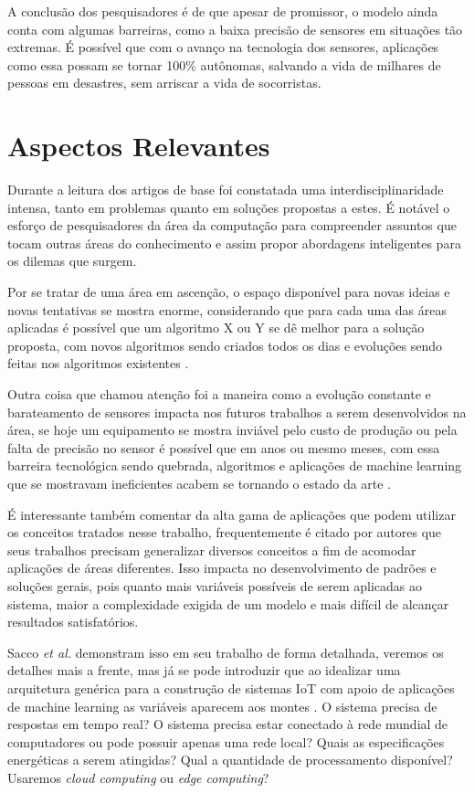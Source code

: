 \documentclass[12pt]{article}
\begin{document}
A conclusão dos pesquisadores é de que apesar de promissor, o modelo ainda conta com algumas barreiras, como a baixa precisão de sensores em situações tão extremas. É possível que com o avanço na tecnologia dos sensores, aplicações como essa possam se tornar 100\% autônomas, salvando a vida de milhares de pessoas em desastres, sem arriscar a vida de socorristas.

\section{Aspectos Relevantes}

Durante a leitura dos artigos de base foi constatada uma interdisciplinaridade intensa, tanto em problemas quanto em soluções propostas a estes. É notável o esforço de pesquisadores da área da computação para compreender assuntos que tocam outras áreas do conhecimento e assim propor abordagens inteligentes para os dilemas que surgem.

Por se tratar de uma área em ascenção, o espaço disponível para novas ideias e novas tentativas se mostra enorme, considerando que para cada uma das áreas aplicadas é possível que um algoritmo X ou Y se dê melhor para a solução proposta, com novos algoritmos sendo criados todos os dias e evoluções sendo feitas nos algoritmos existentes \cite{hameed}.

Outra coisa que chamou atenção foi a maneira como a evolução constante e barateamento de sensores impacta nos futuros trabalhos a serem desenvolvidos na área, se hoje um equipamento se mostra inviável pelo custo de produção ou pela falta de precisão no sensor é possível que em anos ou mesmo meses, com essa barreira tecnológica sendo quebrada, algoritmos e aplicações de machine learning que se mostravam ineficientes acabem se tornando o estado da arte \cite{sacco} \cite{ali}.

É interessante também comentar da alta gama de aplicações que podem utilizar os conceitos tratados nesse trabalho, frequentemente é citado por autores que seus trabalhos precisam generalizar diversos conceitos a fim de acomodar aplicações de áreas diferentes. Isso impacta no desenvolvimento de padrões e soluções gerais, pois quanto mais variáveis possíveis de serem aplicadas ao sistema, maior a complexidade exigida de um modelo e mais difícil de alcançar resultados satisfatórios.

Sacco \emph{et al.} demonstram isso em seu trabalho de forma detalhada, veremos os detalhes mais a frente, mas já se pode introduzir que ao idealizar uma arquitetura genérica para a construção de sistemas IoT com apoio de aplicações de machine learning as variáveis aparecem aos montes \cite{sacco}. O sistema precisa de respostas em tempo real? O sistema precisa estar conectado à rede mundial de computadores ou pode possuir apenas uma rede local? Quais as especificações energéticas a serem atingidas? Qual a quantidade de processamento disponível? Usaremos \emph{cloud computing} ou \emph{edge computing}?
\end{document}
